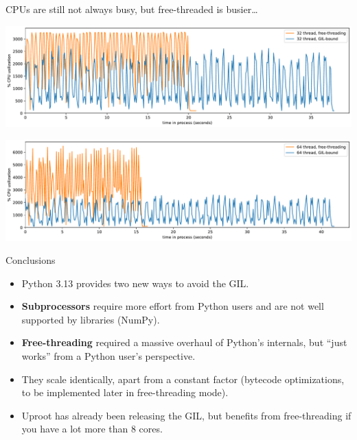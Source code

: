 \documentclass[aspectratio=169]{beamer}
\begin{document}
\begin{frame}{CPUs are still not always busy, but free-threaded is busier\ldots}
\vspace{0.25 cm}
\begin{center}
\includegraphics[width=0.93\linewidth]{img/cpu-of-uproot-internal-big-32.pdf}

\includegraphics[width=0.93\linewidth]{img/cpu-of-uproot-internal-big-64.pdf}
\end{center}
\end{frame}

\begin{frame}{Conclusions}
\vspace{0.3 cm}
\Large
\begin{itemize}\setlength{\itemsep}{0.2 cm}
\item<1-> Python 3.13 provides two new ways to avoid the GIL.
\item<2-> {\bf Subprocessors} require more effort from Python users and are not well supported by libraries (NumPy).
\item<3-> {\bf Free-threading} required a massive overhaul of Python's internals, but ``just works'' from a Python user's perspective.

\vspace{0.2 cm}

\vspace{0.1 cm}
\item<5-> They scale identically, apart from a constant factor (bytecode optimizations, to be implemented later in free-threading mode).
\item<6-> Uproot has already been releasing the GIL, but benefits from free-threading if you have a lot more than 8 cores.
\end{itemize}
\end{frame}
\end{document}
